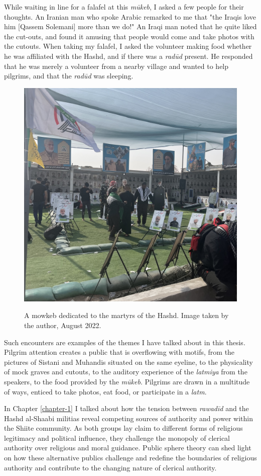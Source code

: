 While waiting in line for a falafel at this \emph{mūkeb}, I asked a few people for their thoughts. An Iranian man who spoke Arabic remarked to me that "the Iraqis love him [Qassem Solemani] more than we do!" An Iraqi man noted that he quite liked the cut-outs, and found it amusing that people would come and take photos with the cutouts. When taking my falafel, I asked the volunteer making food whether he was affiliated with the Hashd, and if there was a \emph{radūd} present. He responded that he was merely a volunteer from a nearby village and wanted to help pilgrims, and that the \emph{radūd} was sleeping. 

\begin{figure}[h]
\caption{A mowkeb dedicated to the martyrs of the Hashd. Image taken by the author, August 2022.}
\centering
\includegraphics[width=.75\textwidth]{images/qassem-mowkeb.jpeg}
\label{fig:qassem-mowkeb}
\end{figure}

Such encounters are examples of the themes I have talked about in this thesis. Pilgrim attention creates a public that is overflowing with motifs, from the pictures of Sistani and Muhandis situated on the same eyeline, to the physicality of mock graves and cutouts, to the auditory experience of the \emph{latmiya} from the speakers, to the food provided by the \emph{mūkeb}. Pilgrims are drawn in a multitude of ways, enticed to take photos, eat food, or participate in a \emph{latm}. 

In Chapter \ref{chapter-1} I talked about how the tension between \emph{rawadīd} and the Hashd al-Shaabi militias reveal competing sources of authority and power within the Shiite community. As both groups lay claim to different forms of religious legitimacy and political influence, they challenge the monopoly of clerical authority over religious and moral guidance. Public sphere theory can shed light on how these alternative publics challenge and redefine the boundaries of religious authority and contribute to the changing nature of clerical authority. 

